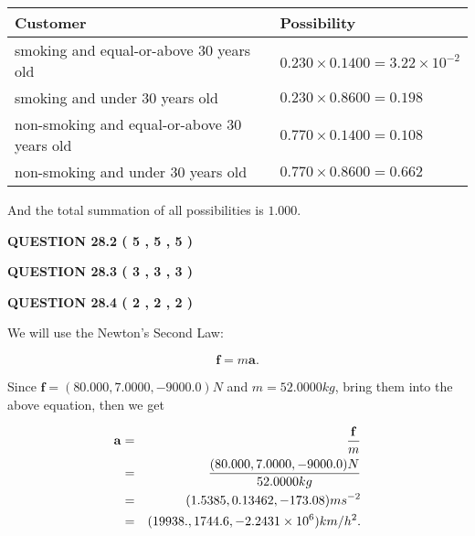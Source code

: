 \documentclass[12pt]{article}
\begin{document}
\noindent
\begin{tabular}{|l|l|}
\hline
Customer & Possibility \\
\hline
smoking  and  %
equal-or-above 30 years old  &
  $ %
0.230 \times  %
0.1400 =  %
3.22 \times 10^{-2}$ \\
\hline
smoking  and  %
under 30 years old &
  $ %
0.230 \times  %
0.8600 =  %
0.198$ \\
\hline
 non-smoking and  %
equal-or-above 30 years old  &
  $ %
0.770 \times  %
0.1400 =  %
0.108$ \\
\hline
 non-smoking and  %
under 30 years old &
  $ %
0.770 \times  %
0.8600 =  %
0.662$ \\
\hline
\end{tabular}
 
\noindent
And the total summation of all possibilities is $  %
1.000 $.
 
 
 
 
  
\vspace{0.2in}
  
{\textbf{\Large{QUESTION
28.2 
 (           5 ,           5 ,           5 )
}}}
  
  
  
\vspace{0.2in}
  
{\textbf{\Large{QUESTION
28.3 
 (           3 ,           3 ,           3 )
}}}
  
  
  
\vspace{0.2in}
  
{\textbf{\Large{QUESTION
28.4 
 (           2 ,           2 ,           2 )
}}}
  
  
 
 

We will use the Newton's Second Law:
 
\[
\mathbf{f}=m\mathbf{a}.
\]
 
Since $\mathbf{f}=( %
80.000,  %
7.0000,  %
-9000.0 )N$
and $m= %
52.0000kg$, bring them into the above equation, then we get
 
\begin{eqnarray*}
\mathbf{a}&=&\frac{\mathbf{f}}m  \\
&=&\frac{(
80.000 ,
7.0000 ,
-9000.0 )N
}{ %
52.0000 kg}  \\
&=&(
1.5385 ,
0.13462,
-173.08
)ms^{-2} \\
&=&(
19938. ,
1744.6 ,
-2.2431 \times 10^{6}
)km/h^2.
\end{eqnarray*}
 
\end{document}
